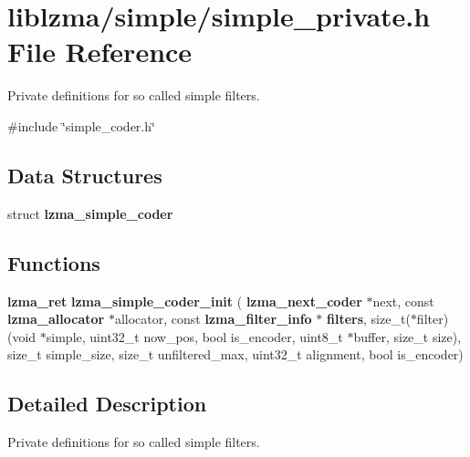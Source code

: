 \section{liblzma/simple/simple\+\_\+private.h File Reference}
\label{simple__private_8h}


Private definitions for so called simple filters.  


{\ttfamily \#include \char`\"{}simple\+\_\+coder.\+h\char`\"{}}\newline
\subsection*{Data Structures}
\begin{DoxyCompactItemize}
\item 
struct \textbf{ lzma\+\_\+simple\+\_\+coder}
\end{DoxyCompactItemize}
\subsection*{Functions}
\begin{DoxyCompactItemize}
\item 
\mbox{\label{simple__private_8h_aff53ad35e18f4f61d0f53f52d9f0dcc7}} 
\textbf{ lzma\+\_\+ret} {\bfseries lzma\+\_\+simple\+\_\+coder\+\_\+init} (\textbf{ lzma\+\_\+next\+\_\+coder} $\ast$next, const \textbf{ lzma\+\_\+allocator} $\ast$allocator, const \textbf{ lzma\+\_\+filter\+\_\+info} $\ast$\textbf{ filters}, size\+\_\+t($\ast$filter)(void $\ast$simple, uint32\+\_\+t now\+\_\+pos, bool is\+\_\+encoder, uint8\+\_\+t $\ast$buffer, size\+\_\+t size), size\+\_\+t simple\+\_\+size, size\+\_\+t unfiltered\+\_\+max, uint32\+\_\+t alignment, bool is\+\_\+encoder)
\end{DoxyCompactItemize}


\subsection{Detailed Description}
Private definitions for so called simple filters. 

